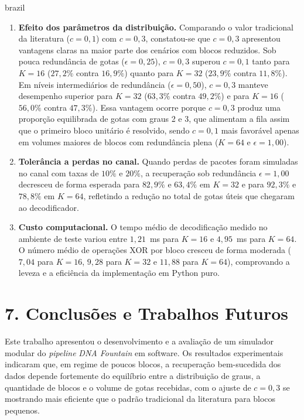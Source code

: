\begin{resumo}
\begin{otherlanguage*}{brazil}
\begin{enumerate}
    \item \textbf{Efeito dos parâmetros da distribuição.} Comparando o valor tradicional da literatura ($c = 0{,}1$) com $c = 0{,}3$, constatou-se que $c = 0{,}3$ apresentou vantagens claras na maior parte dos cenários com blocos reduzidos. Sob pouca redundância de gotas ($\epsilon = 0{,}25$), $c = 0{,}3$ superou $c = 0{,}1$ tanto para $K = 16$ ($27{,}2\%$ contra $16{,}9\%$) quanto para $K = 32$ ($23{,}9\%$ contra $11{,}8\%$). Em níveis intermediários de redundância ($\epsilon = 0{,}50$), $c = 0{,}3$ manteve desempenho superior para $K = 32$ ($63{,}3\%$ contra $49{,}2\%$) e para $K = 16$ ($56{,}0\%$ contra $47{,}3\%$). Essa vantagem ocorre porque $c = 0{,}3$ produz uma proporção equilibrada de gotas com graus 2 e 3, que alimentam a fila assim que o primeiro bloco unitário é resolvido, sendo $c = 0{,}1$ mais favorável apenas em volumes maiores de blocos com redundância plena ($K = 64$ e $\epsilon = 1{,}00$).
    
    \item \textbf{Tolerância a perdas no canal.} Quando perdas de pacotes foram simuladas no canal com taxas de $10\%$ e $20\%$, a recuperação sob redundância $\epsilon = 1{,}00$ decresceu de forma esperada para $82{,}9\%$ e $63{,}4\%$ em $K = 32$ e para $92{,}3\%$ e $78{,}8\%$ em $K = 64$, refletindo a redução no total de gotas úteis que chegaram ao decodificador.
    
    \item \textbf{Custo computacional.} O tempo médio de decodificação medido no ambiente de teste variou entre $1{,}21$~ms para $K = 16$ e $4{,}95$~ms para $K = 64$. O número médio de operações XOR por bloco cresceu de forma moderada ($7{,}04$ para $K=16$, $9{,}28$ para $K=32$ e $11{,}88$ para $K=64$), comprovando a leveza e a eficiência da implementação em Python puro.
\end{enumerate}

\section*{7. Conclusões e Trabalhos Futuros}

Este trabalho apresentou o desenvolvimento e a avaliação de um simulador modular do \emph{pipeline} \emph{DNA Fountain} em software. Os resultados experimentais indicaram que, em regime de poucos blocos, a recuperação bem-sucedida dos dados depende fortemente do equilíbrio entre a distribuição de graus, a quantidade de blocos e o volume de gotas recebidas, com o ajuste de $c = 0{,}3$ se mostrando mais eficiente que o padrão tradicional da literatura para blocos pequenos.


\end{otherlanguage*}
\end{resumo}
